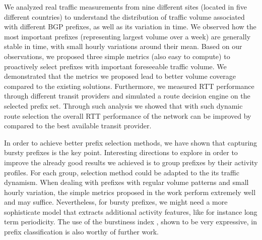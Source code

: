 \documentclass[10pt, conference,letterpaper]{IEEEtran}
\begin{document}
We analyzed real traffic measurements from nine different sites (located in five different countries) to understand the distribution of traffic volume associated with different BGP prefixes, as well as its variation in time.   
We observed how the most important prefixes (representing largest volume over a week) are generally stable in time, with small hourly variations around their mean. 
Based on our observations, we proposed three simple 
metrics (also easy to compute) to proactively select prefixes with important foreseeable traffic volume.
We demonstrated that the metrics we proposed lead to better volume coverage compared to the existing solutions.
Furthermore, we measured RTT performance through different transit providers and simulated a route decision engine on the selected prefix set. 
Through such analysis we showed that  with such dynamic route selection the overall RTT performance of the network can be improved by  compared to the best available transit provider. 

In order to achieve better prefix selection methods, we have shown that capturing bursty prefixes is the key point. 
Interesting directions to explore in order to improve the already good results we achieved is to group prefixes by their activity profiles. 
For each group, selection method could be adapted to the its traffic dynamism.
When dealing with prefixes with regular volume patterns and small hourly variation, the simple metrics proposed in the work perform extremely well and may suffice. 
Nevertheless, for bursty prefixes, we might need a more sophisticate model that extracts additional activity features, like for instance long term periodicity.
The use of the burstiness index , shown to be very expressive, in prefix classification is also worthy of further work.



\end{document}
